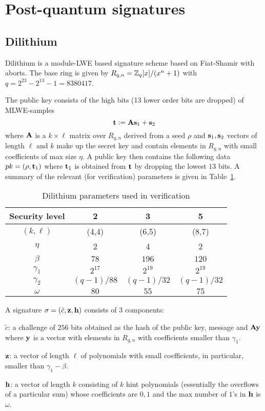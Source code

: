 \section{Post-quantum signatures}
\label{section:signatures}
 
\subsection{Dilithium}

Dilithium is a module-LWE based signature scheme based on Fiat-Shamir with aborts.  The base ring is given 
by $R_{q,n} = \mathbb{Z}_q[x]/(x^n+1)$ with $q = 2^{23} - 2^{13} - 1 = 8380417$.

The public key consists of the high bits (13 lower order bits are dropped) of MLWE-samples
\[ \mathbf{t} :=  \mathbf{A} \mathbf{s}_1 + \mathbf{s}_2 \]
where $\mathbf{A}$ is a $k \times \ell$  matrix over $R_{q,n}$ derived from a seed $\rho$ 
and $\mathbf{s}_1, \mathbf{s}_2$ vectors of length $\ell$ and $k$ make up the secret key and 
contain elements in $R_{q,n}$ with small coefficients of max size $\eta$.
A public key then contains the following data $pk = (\rho, \mathbf{t}_1)$ where $\mathbf{t}_1$
is obtained from $\mathbf{t}$ by dropping the lowest $13$ bits.
A summary of the relevant (for verification) parameters is given in Table~\ref{tab:dilithium}.

\begin{table}\caption{Dilithium parameters used in verification}\label{tab:dilithium}
\begin{center}
\begin{tabular}{c|c|c|c}
\hline
Security level & 2 & 3 & 5 \\
\hline
$(k,\ell)$ & (4,4) & (6,5) & (8,7) \\
$\eta$ & 2 & 4 & 2 \\
$\beta$ & $78$ & $196$ & $120$ \\
$\gamma_1$ & $2^{17}$ & $2^{19}$ & $2^{19}$ \\ 
$\gamma_2$ & $(q-1)/88$ & $(q-1)/32$ & $(q-1)/32$ \\
$\omega$ & $80$ & $55$ & $75$ \\
\hline
\end{tabular}
\end{center}
\end{table}

A signature $\sigma = (\tilde{c}, \mathbf{z}, \mathbf{h})$ consists of 3 components:
\bit
\item $\tilde{c}$: a challenge of $256$ bits obtained as the hash of the public key, message and $\mathbf{A} \mathbf{y}$ where $\mathbf{y}$
is a vector with elements in $R_{q,n}$ with coefficients smaller than $\gamma_1$. 
\item $\mathbf{z}$: a vector of length $\ell$ of polynomials with small coefficients, in particular, smaller than $\gamma_1 - \beta$.
\item $\mathbf{h}$: a vector of length $k$ consisting of $k$ hint polynomials (essentially the overflows of a particular sum) whose
coefficients are ${0,1}$ and the max number of $1$'s in $\mathbf{h}$ is $\omega$.
\eit

